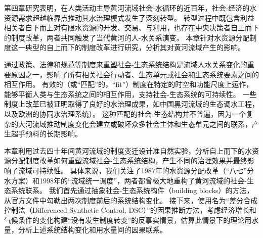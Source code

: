 第四章研究表明，在人类活动主导黄河流域社会-水循环的近百年，社会-经济的水资源需求超越临界点推动其水治理模式发生了深刻转型。
转型过程中既包含利益相关者自下而上对有限水资源的开发、交易、与利用，也存在中央决策者自上而下的制度改革，两者共同触发了当代黄河的人-水关系演变。
本章针对水资源分配制度这一典型的自上而下的制度改革进行研究，分析其对黄河流域产生的影响。

通过政策、法律和规范等制度来重塑社会-生态系统结构是流域人水关系变化的重要原因之一，影响了所有相关社会行动者、生态单元或社会和生态系统要素之间的相互作用\cite{lien2020, bodin2017b}。
有效的（或“匹配”的，``fit''）制度在特定的时空和功能尺度上运作，能够平衡人类与生态系统之间的相互作用，支持社会-生态系统的可持续性\cite{epstein2015, wang2019d}。
一些制度上改革已被证明取得了良好的水治理成果，如中国黑河流域的生态调水工程\cite{wang2019d}，以及欧洲的协同水治理系统\cite{green2013}）。
这种匹配的社会-生态结构并不普遍，因为一个复杂的大河流域推动制度变化会建立或破坏众多社会主体和生态单元之间的联系，产生超乎预料的长期影响。

本章利用过去四十年间黄河流域的制度变迁设计准自然实验，分析自上而下的水资源分配制度改革如何重塑流域社会-生态系统结构，产生不同的治理效果并最终影响了流域可持续性。
具体来说，我们关注了1987年的水资源分配改革（“八七”分水方案）和1998年的“流域统一调度”，两者都曾极大地重构了黄河流域的社会-生态系统联系。
我们首先通过抽象社会-生态系统构件（building blocks）的方法，从官方文件中勾勒出两次制度前后的系统结构变化。
接下来，使用名为“差分合成控制法（Differenced Synthetic Control, DSC）”的因果推断方法\cite{arkhangelsky2021}，考虑经济增长和气候条件的变化构建“没有发生制度转变”的反事实情景，估算此情景下的理论用水量，分析上述系统结构变化和用水量间的因果联系。
